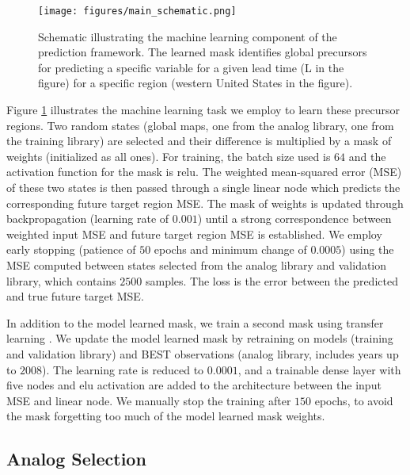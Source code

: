 \begin{figure}[h!]
    \noindent\texttt{[image: figures/main\_schematic.png]}
    \caption{Schematic illustrating the machine learning component of the prediction framework.
    The learned mask identifies global precursors for predicting a specific variable for a given lead time (L in the figure) for a specific region (western United States in the figure).}
    \label{fig:framework}
\end{figure}

Figure \ref{fig:framework} illustrates the machine learning task we employ to learn these precursor regions.
Two random states (global maps, one from the analog library, one from the training library) are selected and their difference is multiplied by a mask of weights (initialized as all ones).
For training, the batch size used is $64$ and the activation function for the mask is relu.
The weighted mean-squared error (MSE) of these two states is then passed through a single linear node which predicts the corresponding future target region MSE.
The mask of weights is updated through backpropagation (learning rate of $0.001$) until a strong correspondence between weighted input MSE and future target region MSE is established.
We employ early stopping (patience of $50$ epochs and minimum change of $0.0005$) using the MSE computed between states selected from the analog library and validation library, which contains $2500$ samples.
The loss is the error between the predicted and true future target MSE. 

In addition to the model learned mask, we train a second mask using transfer learning \cite{pan2010, ghani2024}.
We update the model learned mask by retraining on models (training and validation library) and BEST observations (analog library, includes years up to $2008$).
The learning rate is reduced to $0.0001$, and a trainable dense layer with five nodes and elu activation are added to the architecture between the input MSE and linear node.
We manually stop the training after $150$ epochs, to avoid the mask forgetting too much of the model learned mask weights.


\subsection{Analog Selection}\label{sec:selection}


